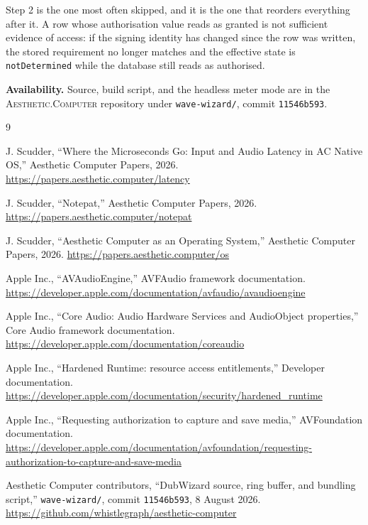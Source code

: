 \documentclass[10pt,letterpaper,twocolumn]{article}
\newcommand{\ac}{\textsc{Aesthetic.Computer}}
\newcommand{\code}[1]{\texttt{#1}}
\begin{document}
\noindent Step 2 is the one most often skipped, and it is the one that reorders everything after it. A row whose authorisation value reads as granted is not sufficient evidence of access: if the signing identity has changed since the row was written, the stored requirement no longer matches and the effective state is \code{notDetermined} while the database still reads as authorised.

\vspace{0.6em}
\noindent\textbf{Availability.} Source, build script, and the headless meter mode are in the \ac{} repository under \code{wave-wizard/}, commit \code{11546b593}.

\small
\begin{thebibliography}{9}

J. Scudder, ``Where the Microseconds Go: Input and Audio Latency in AC Native OS,'' Aesthetic Computer Papers, 2026. \url{https://papers.aesthetic.computer/latency}

J. Scudder, ``Notepat,'' Aesthetic Computer Papers, 2026. \url{https://papers.aesthetic.computer/notepat}

J. Scudder, ``Aesthetic Computer as an Operating System,'' Aesthetic Computer Papers, 2026. \url{https://papers.aesthetic.computer/os}

Apple Inc., ``AVAudioEngine,'' AVFAudio framework documentation. \url{https://developer.apple.com/documentation/avfaudio/avaudioengine}

Apple Inc., ``Core Audio: Audio Hardware Services and AudioObject properties,'' Core Audio framework documentation. \url{https://developer.apple.com/documentation/coreaudio}

Apple Inc., ``Hardened Runtime: resource access entitlements,'' Developer documentation. \url{https://developer.apple.com/documentation/security/hardened_runtime}

Apple Inc., ``Requesting authorization to capture and save media,'' AVFoundation documentation. \url{https://developer.apple.com/documentation/avfoundation/requesting-authorization-to-capture-and-save-media}

Aesthetic Computer contributors, ``DubWizard source, ring buffer, and bundling script,'' \code{wave-wizard/}, commit \code{11546b593}, 8 August 2026. \url{https://github.com/whistlegraph/aesthetic-computer}

\end{thebibliography}
\end{document}
